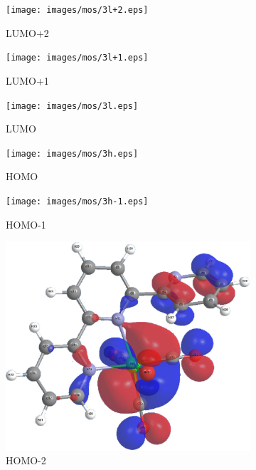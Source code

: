 \begin{figure}[!ht]
 \centering
 \begin{subfigure}[b]{0.31\textwidth}
  \texttt{[image: images/mos/3l+2.eps]}
  \caption{LUMO+2}
 \end{subfigure}
  \begin{subfigure}[b]{0.31\textwidth}
  \texttt{[image: images/mos/3l+1.eps]}
  \caption{LUMO+1}
 \end{subfigure}
  \begin{subfigure}[b]{0.31\textwidth}
  \texttt{[image: images/mos/3l.eps]}
  \caption{LUMO}
 \end{subfigure}
 \begin{subfigure}[b]{0.31\textwidth}
  \texttt{[image: images/mos/3h.eps]}
  \caption{HOMO}
 \end{subfigure}
 \begin{subfigure}[b]{0.31\textwidth}
  \texttt{[image: images/mos/3h-1.eps]}
  \caption{HOMO-1}
 \end{subfigure}
 \begin{subfigure}[b]{0.31\textwidth}
  \includegraphics[clip=true, width=\textwidth, keepaspectratio]{images/mos/3h-2.eps}
  \caption{HOMO-2}
 \end{subfigure}
 \begin{subfigure}[b]{0.31\textwidth}

\end{subfigure}
\end{figure}
